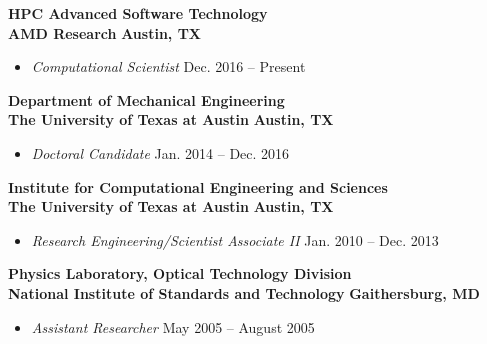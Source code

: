 \textbf{HPC Advanced Software Technology}\\
\textbf{AMD Research} \hfill \textbf{Austin, TX}
%
\begin{itemize}
\item[] \textit{Computational Scientist} \hfill
	Dec. 2016 -- Present
\end{itemize}

\blankline


\textbf{Department of Mechanical Engineering}\\
\textbf{The University of Texas at Austin} \hfill \textbf{Austin, TX}
%
\begin{itemize}
\item[] \textit{Doctoral Candidate} \hfill
	Jan. 2014 -- Dec. 2016
\end{itemize}

\blankline

\textbf{Institute for Computational Engineering and Sciences}\\
\textbf{The University of Texas at Austin} \hfill \textbf{Austin, TX}
%
\begin{itemize}
\item[] \textit{Research Engineering/Scientist Associate II} \hfill
	Jan. 2010 -- Dec. 2013
\end{itemize}

\blankline

\textbf{Physics Laboratory, Optical Technology Division}\\
\textbf{National Institute of Standards and Technology} \hfill \textbf{Gaithersburg, MD}
%
\begin{itemize}
\item[] \textit{Assistant Researcher} \hfill
	May 2005 -- August 2005
\end{itemize}